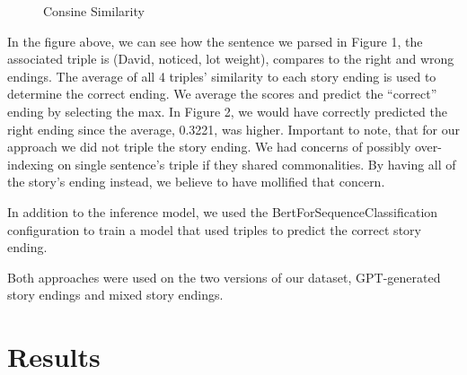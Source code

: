 \documentclass{article}
\begin{document}
\begin{multicols}{2}
\begin{figure}[H]
    \centering
    \caption{Consine Similarity}
\end{figure}

In the figure above, we can see how the sentence we parsed in Figure 1, the associated triple is (David, noticed, lot weight), compares to the right and wrong endings. The average of all 4 triples' similarity to each story ending is used to determine the correct ending. We average the scores and predict the “correct” ending by selecting the max. In Figure 2, we would have correctly predicted the right ending since the average, 0.3221, was higher. Important to note, that for our approach we did not triple the story ending. We had concerns of possibly over-indexing on single sentence’s triple if they shared commonalities. By having all of the story’s ending instead, we believe to have mollified that concern.

In addition to the inference model, we used the BertForSequenceClassification configuration to train a model that used triples to predict the correct story ending.

Both approaches were used on the two versions of our dataset, GPT-generated story endings and mixed story endings. 

\section{Results}

\begin{figure}[H]
    \centering
\end{figure}


\end{multicols}
\end{document}
